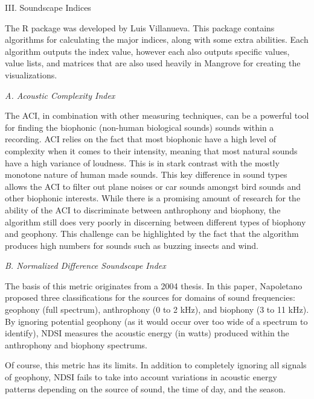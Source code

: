 \begin{center}
III. Soundscape Indices
\end{center}
\begin{flushleft}
\setlength{\parindent}{0.125in}
The  R package was developed by Luis Villanueva. This package contains algorithms for calculating the major indices, along with some extra abilities. Each algorithm outputs the index value, however each also outputs specific values, value lists, and matrices that are also used heavily in Mangrove for creating the visualizations.\par

\noindent\textit{A. Acoustic Complexity Index}\par
The ACI, in combination with other measuring techniques, can be a powerful tool for finding the biophonic (non-human biological sounds) sounds within a recording. ACI relies on the fact that most biophonic have a high level of complexity when it comes to their intensity, meaning that most natural sounds have a high variance of loudness. This is in stark contrast with the mostly monotone nature of human made sounds. This key difference in sound types allows the ACI to filter out plane noises or car sounds amongst bird sounds and other biophonic interests. While there is a promising amount of research for the ability of the ACI to discriminate between anthrophony and biophony, the algorithm still does very poorly in discerning between different types of biophony and geophony. This challenge can be highlighted by the fact that the algorithm produces high numbers for sounds such as buzzing insects and wind.\par

\noindent\textit{B. Normalized Difference Soundscape Index}\par
The basis of this metric originates from a 2004 thesis.\cite{napoletano} In this paper, Napoletano proposed three classifications for the sources for domains of sound frequencies: geophony (full spectrum), anthrophony (0 to 2 kHz), and biophony (3 to 11 kHz). By ignoring potential geophony (as it would occur over too wide of a spectrum to identify), NDSI measures the acoustic energy (in watts) produced within the anthrophony and biophony spectrums.\par
Of course, this metric has its limits. In addition to completely ignoring all signals of geophony, NDSI fails to take into account variations in acoustic energy patterns depending on the source of sound, the time of day, and the season.\par


\end{flushleft}
